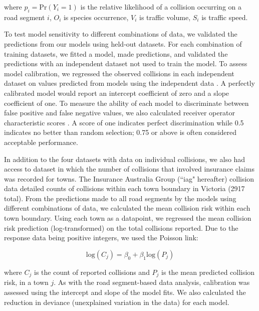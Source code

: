 \noindent where $p_i=\text{Pr}(Y_i=1)$ is the relative likelihood of a collision occurring on a road segment $i$, $O_i$ is species occurrence, $V_i$ is traffic volume, $S_i$ is traffic speed.

To test model sensitivity to different combinations of data, we validated the predictions from our models using held-out datasets. For each combination of training datasets, we fitted a model, made predictions, and validated the predictions with an independent dataset not used to train the model. To assess model calibration, we regressed the observed collisions in each independent dataset on values predicted from models using the independent data \citep[see][]{mill91}. A perfectly calibrated model would report an intercept coefficient of zero and a slope coefficient of one. To measure the ability of each model to discriminate between false positive and false negative values, we also calculated receiver operator characteristic scores \citep[see][]{metz78}. A score of one indicates perfect discrimination while 0.5 indicates no better than random selection; 0.75 or above is often considered acceptable performance.

In addition to the four datasets with data on individual collisions, we also had access to dataset in which the number of collisions that involved insurance claims was recorded for towns. The Insurance Australia Group (``iag" hereafter) collision data detailed counts of collisions within each town boundary in Victoria (2917 total). From the predictions made to all road segments by the models using different combinations of data, we calculated the mean collision risk within each town boundary. Using each town as a datapoint, we regressed the mean collision risk prediction (log-transformed) on the total collisions reported. Due to the response data being positive integers, we used the Poisson link:

\begin{equation} \label{eq:62}
\text{log}(C_j) = \beta_0 + \beta_1\text{log}(P_j)
\end{equation}

\noindent where $C_j$ is the count of reported collisions and $P_j$ is the mean predicted collision risk, in a town $j$. As with the road segment-based data analysis, calibration was assessed using the intercept and slope of the model fits. We also calculated the reduction in deviance (unexplained variation in the data) for each model.

